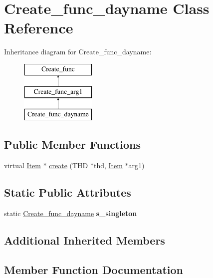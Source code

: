 \hypertarget{classCreate__func__dayname}{}\section{Create\+\_\+func\+\_\+dayname Class Reference}
\label{classCreate__func__dayname}
Inheritance diagram for Create\+\_\+func\+\_\+dayname\+:\begin{figure}[H]
\begin{center}
\leavevmode
\includegraphics[height=3.000000cm]{classCreate__func__dayname}
\end{center}
\end{figure}
\subsection*{Public Member Functions}
\begin{DoxyCompactItemize}
\item 
virtual \mbox{\hyperlink{classItem}{Item}} $\ast$ \mbox{\hyperlink{classCreate__func__dayname_a5935b5afbedbd0ea482eb84dc2f257c7}{create}} (T\+HD $\ast$thd, \mbox{\hyperlink{classItem}{Item}} $\ast$arg1)
\end{DoxyCompactItemize}
\subsection*{Static Public Attributes}
\begin{DoxyCompactItemize}
\item 
\mbox{\label{classCreate__func__dayname_ae032fb9fcc78d6262b75cc9f9321862d}} 
static \mbox{\hyperlink{classCreate__func__dayname}{Create\+\_\+func\+\_\+dayname}} {\bfseries s\+\_\+singleton}
\end{DoxyCompactItemize}
\subsection*{Additional Inherited Members}


\subsection{Member Function Documentation}
\mbox{\label{classCreate__func__dayname_a5935b5afbedbd0ea482eb84dc2f257c7}} 
